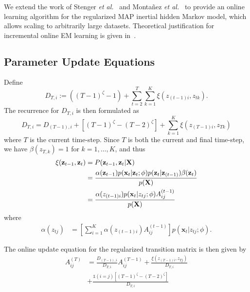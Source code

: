 \documentclass{article}
\begin{document}
We extend the work of Stenger \emph{et
al.}~ and Monta\~nez \emph{et
al.}~ to provide an online learning algorithm for the
regularized MAP inertial hidden Markov model, which allows scaling to arbitrarily large
datasets. Theoretical justification for incremental online EM learning is given
in~\cite{Neal:1999:VEA:308574.308679}.

\subsection{Parameter Update Equations}

Define 
\[
   D_{T,i} := ((T-1)^\zeta -1) + \sum_{t=2}^{T}\sum_{k=1}^{K} \xi(z_{(t-1)i}, z_{tk}).
\]
The recurrence for $D_{T,i}$ is then formulated as
\begin{equation*}
    D_{T,i} = D_{(T-1), i} + [(T-1)^\zeta - (T-2)^\zeta] + \sum_{k=1}^{K}
    \xi(z_{(T-1)i}, z_{Tk})
\end{equation*}
where $T$ is the current time-step. Since $T$ is both the current and final time-step, we have $\beta(z_{T,k}) = 1$ for $k = 1, \ldots, K$, and thus
\begin{align}
    \xi(\mathbf{z}_{t-1}, \mathbf{z}_{t}) 
            &= P(\mathbf{z}_{t-1}, \mathbf{z}_{t} | \mathbf{X}) \notag{}\\
            &= \frac{\alpha(\mathbf{z}_{t-1})p(\mathbf{x}_t|\mathbf{z}_t; \phi)p(\mathbf{z}_{t}|\mathbf{z}_{(t-1)})\beta(\mathbf{z}_t)}{p(\mathbf{X})} \notag{}\\
            &= \frac{\alpha(z_{(t-1)i})p(\mathbf{x}_t| z_{tj}; \phi)A_{ij}^{(t-1)}}{p(\mathbf{X})}
\end{align}
where
\begin{align}\label{eq:alpha-recursion}
    \alpha(z_{tj}) &= \left[\sum_{i=1}^{K} \alpha(z_{(t-1)i})A_{ij}^{(t-1)}\right]p(\mathbf{x}_t| z_{tj}; \phi).
\end{align}

The online update equation for the regularized transition matrix is then given by
\begin{align*}
    A_{ij}^{(T)} &= \frac{D_{(T-1), i}}{D_{T,i}}A_{ij}^{(T-1)}
    + \frac{\xi(z_{(T-1)i}, z_{Tj})}{D_{T,i}} \\
                 &+ \frac{\mathds{1}(i = j)[(T-1)^\zeta - (T-2)^\zeta]}{D_{T,i}}
\end{align*}
\end{document}

